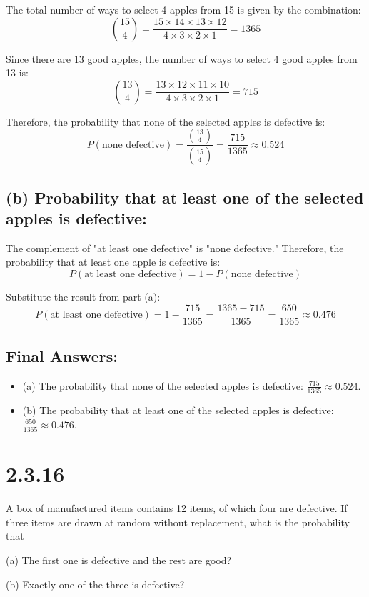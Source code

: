 \documentclass{article}
\begin{document}
The total number of ways to select 4 apples from 15 is given by the combination:
\[
\binom{15}{4} = \frac{15 \times 14 \times 13 \times 12}{4 \times 3 \times 2 \times 1} = 1365
\]

Since there are 13 good apples, the number of ways to select 4 good apples from 13 is:
\[
\binom{13}{4} = \frac{13 \times 12 \times 11 \times 10}{4 \times 3 \times 2 \times 1} = 715
\]

Therefore, the probability that none of the selected apples is defective is:
\[
P(\text{none defective}) = \frac{\binom{13}{4}}{\binom{15}{4}} = \frac{715}{1365} \approx 0.524
\]

\subsection*{(b) Probability that at least one of the selected apples is defective:}

The complement of "at least one defective" is "none defective." Therefore, the probability that at least one apple is defective is:
\[
P(\text{at least one defective}) = 1 - P(\text{none defective})
\]

Substitute the result from part (a):
\[
P(\text{at least one defective}) = 1 - \frac{715}{1365} = \frac{1365 - 715}{1365} = \frac{650}{1365} \approx 0.476
\]

\subsection*{Final Answers:}
\begin{itemize}
    \item (a) The probability that none of the selected apples is defective: \( \frac{715}{1365} \approx 0.524 \).
    \item (b) The probability that at least one of the selected apples is defective: \( \frac{650}{1365} \approx 0.476 \).
\end{itemize}

\section*{2.3.16}

A box of manufactured items contains 12 items, of which four are defective. If three items are drawn at random without replacement, what is the probability that

(a) The first one is defective and the rest are good?

(b) Exactly one of the three is defective?
\end{document}
